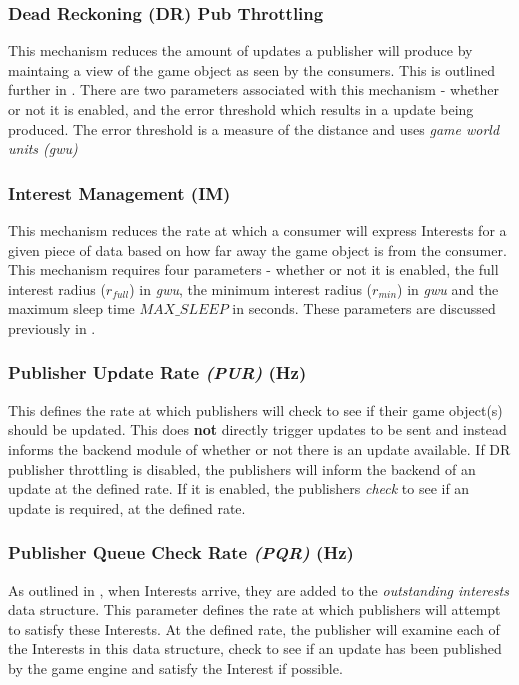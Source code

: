 \subsubsection*{Dead Reckoning (DR) Pub Throttling}
This mechanism reduces the amount of updates a publisher will produce by maintaing a view of the game object as seen by the consumers. This is outlined further in . There are two parameters associated with this mechanism - whether or not it is enabled, and the error threshold which results in a update being produced. The error threshold is a measure of the distance and uses \textit{game world units (gwu)} 


\subsubsection*{Interest Management (IM)}
This mechanism reduces the rate at which a consumer will express Interests for a given piece of data based on how far away the game object is from the consumer. This mechanism requires four parameters - whether or not it is enabled, the full interest radius ($r_{full}$) in \textit{gwu}, the minimum interest radius ($r_{min}$) in \textit{gwu} and the maximum sleep time $MAX\_SLEEP$ in seconds. These parameters are discussed previously in . 

\subsubsection*{Publisher Update Rate \textit{(PUR)} (Hz)}
This defines the rate at which publishers will check to see if their game object(s) should be updated. This does \textbf{not} directly trigger updates to be sent and instead informs the backend module of whether or not there is an update available. If DR publisher throttling is disabled, the publishers will inform the backend of an update at the defined rate. If it is enabled, the publishers \textit{check} to see if an update is required, at the defined rate. 

\subsubsection*{Publisher Queue Check Rate \textit{(PQR)} (Hz)}
As outlined in , when Interests arrive, they are added to the \textit{outstanding interests} data structure. This parameter defines the rate at which publishers will attempt to satisfy these Interests. At the defined rate, the publisher will examine each of the Interests in this data structure, check to see if an update has been published by the game engine and satisfy the Interest if possible. 

